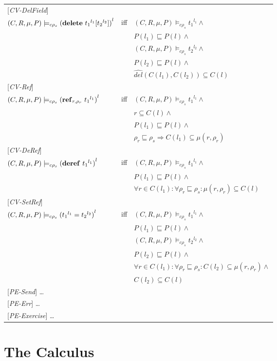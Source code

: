 \documentclass[[12pt,a4paper,twoside,openrigh]{article}
\newcommand{\envs}{(C,R,\mu, P)}
\newcommand{\ccest}[1]{\envs \models_{c \rho_s} #1}
\newcommand{\ccestl}[1]{\envs \models_{c \rho_s} {(#1)}^{l}}
\newcommand{\lbt}[1]{{t_#1}^{l_#1}}
\begin{document}
\begin{tabular} {l l l}
{[\textit{CV-DelField}]}\\
$\ccestl {\delete {\lbt 1} {\lbt 2}} $& iff &$ \ccest {\lbt 1} \wedge $\\
&& $P(l_1) \sqsubseteq P(l) \wedge$ \\
&& $ \ccest {\lbt 2} \wedge $ \\
&& $P(l_2) \sqsubseteq P(l) \wedge$ \\
&& $\widehat{del} (C(l_1), C(l_2)) \subseteq C(l)$\\
{[\textit{CV-Ref}]}\\
$ \ccestl {\newref {r,\rho_r} {\lbt 1}} $& iff &$ \ccest {\lbt 1} \wedge $\\
&& $ {r} \subseteq C(l) \wedge$ \\
&& $ P(l_1) \sqsubseteq P(l) \wedge$ \\
&& $ \rho_r \sqsubseteq \rho_s \Rightarrow C(l_1) \subseteq \mu(r, \rho_r) $ \\
{[\textit{CV-DeRef}]}\\
$\ccestl {\deref {\lbt 1}} $& iff &$ \ccest {\lbt 1}\wedge $\\
&& $P(l_1) \sqsubseteq P(l) \wedge$ \\
&& $\forall r \in C(l_1) : \forall \rho_r \sqsubseteq \rho_s : \mu(r, \rho_r) \subseteq C(l)$ \\
{[\textit{CV-SetRef}]}\\
$\ccestl {\setref {\lbt 1} {\lbt 2}} $& iff &$ \ccest {\lbt 1} \wedge $\\
&& $ P(l_1) \sqsubseteq P(l) \wedge $ \\
&& $ \ccest {\lbt 2} \wedge $ \\
&& $ P(l_2) \sqsubseteq P(l) \wedge $ \\
&& $ \forall r \in C(l_1) : \forall \rho_r \sqsubseteq \rho_s : C(l_2) \subseteq \mu(r, \rho_r) \wedge$ \\
&& $ C(l_2) \subseteq C(l) $ \\
{[\textit{PE-Send}]} \dots \\
{[\textit{PE-Err}]} \dots \\
{[\textit{PE-Exercise}]} \dots \\
\end{tabular}
% 
\section{The Calculus}
\label{sec:calculus}
\end{document}
